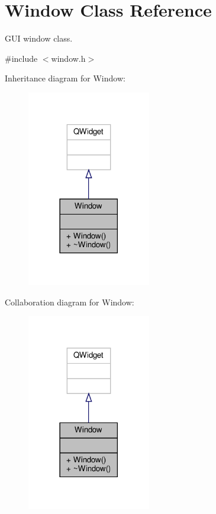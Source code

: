 \hypertarget{classWindow}{}\section{Window Class Reference}
\label{classWindow}


G\+UI window class.  




{\ttfamily \#include $<$window.\+h$>$}



Inheritance diagram for Window\+:\nopagebreak
\begin{figure}[H]
\begin{center}
\leavevmode
\includegraphics[width=153pt]{classWindow__inherit__graph}
\end{center}
\end{figure}


Collaboration diagram for Window\+:\nopagebreak
\begin{figure}[H]
\begin{center}
\leavevmode
\includegraphics[width=153pt]{classWindow__coll__graph}
\end{center}
\end{figure}
